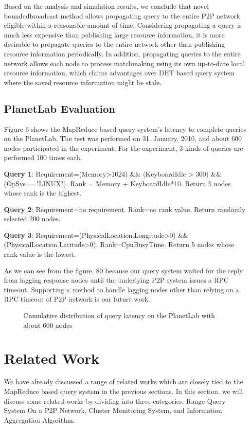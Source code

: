 \documentclass{acm_proc_article-sp}
\begin{document}
Based on the analysis and simulation results, we conclude that novel boundedbroadcast method allows propagating query to the entire P2P network eligible within a reasonable amount of time.
Considering propagating a query is much less expensive than publishing large resource information, it is more desirable to propagate queries to the entire network other than publishing resource information periodically. 
In addition, propagating queries to the entire network allows each node to process matchmaking using its own up-to-date local resource information, 
which claims advantages over DHT based query system where the saved resource information might be stale.

\subsection{PlanetLab Evaluation}
Figure 6 shows the MapReduce based query system's latency to complete queries on the PlanetLab. The test was performed on 31. January. 2010, and about 600 nodes participated in the experiment.
For the experiment, 3 kinds of queries are performed 100 times each. 

\textbf{Query 1}: Requirement=(Memory>1024) \&\& (KeyboardIdle > 300) \&\& (OpSys=="LINUX"). Rank = Memory + KeyboardIdle*10. Return 5 nodes whose rank is the highest.

\textbf{Query 2}: Requirement=no requirement. Rank=no rank value. Return randomly selected 200 nodes. 

\textbf{Query 3}: Requirement=(PhysicalLocation.Longitude>0) \&\& (PhysicalLocation.Latitude>0). Rank=CpuBusyTime. Return 5 nodes whose rank value is the lowest.

As we can see from the figure, 80%
because our query system waited for the reply from lagging response nodes until the underlying P2P system issues a RPC timeout.
Supporting a method to handle lagging nodes other than relying on a RPC timeout of P2P network is our future work.
\begin{figure}
\centering
{}
\caption{Cumulative distribution of query latency on the PlanetLab with about 600 nodes}
\end{figure}
\section{Related Work}
We have already discussed a range of related works which are closely tied to the MapReduce based query system in the previous sections. 
In this section, we will discuss some related works by dividing into three categories:
Range Query System On a P2P Network, Cluster Monitoring System, and Information Aggregation Algorithm.
\end{document}
